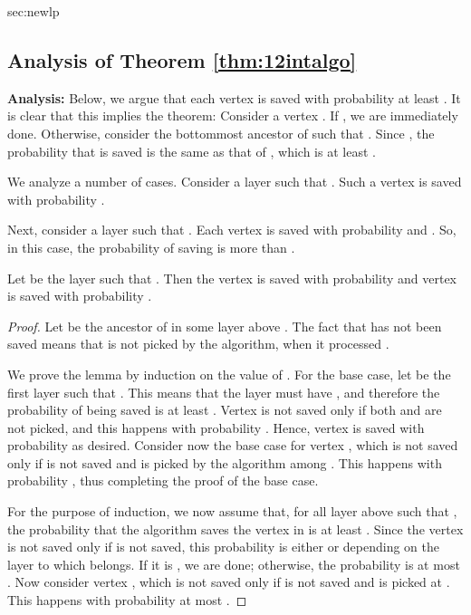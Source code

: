 \begin{appendixextra}{sec:newlp}{\subsection{Analysis of Theorem \ref{thm:12intalgo}}}
\textbf{Analysis: }    
Below, we argue that each vertex  is saved with probability at least . 
It is clear that this implies the theorem: Consider a vertex .
If , we are immediately done. Otherwise, consider the bottommost ancestor  of  such that . 
Since , the probability that  is saved is the same as that of , which is at least .    

We analyze a number of cases.
Consider a layer  such that . 
Such a vertex  is saved with probability . 

Next, consider a layer  such that . 
Each vertex  is saved with probability  and . 
So, in this case, the probability of saving  is more than .  

\begin{lemma}
\label{one-and-one} 
Let  be the layer such that . 
Then the vertex  is saved with probability  and vertex  is saved with probability . 
\end{lemma} 

\begin{proof} 
Let  be the ancestor of  in some layer above . 
The fact that  has not been saved means that  is not picked by the algorithm, when it processed . 

We prove the lemma by induction on the value of . 
For the base case, let  be the first layer such that .
This means that the layer  must have , and therefore the probability of  being saved is at least . 
Vertex  is not saved only if both  and  are not picked, and this happens with probability .
Hence, vertex  is saved with probability  as desired.   
Consider now the base case for vertex , which is not saved only if  is not saved and  is picked by the algorithm among .
This happens with probability , thus completing the proof of the base case.   


 For the purpose of induction, we now assume that, for all layer  above  such that , the probability that the algorithm saves the vertex in  is at least .
Since the vertex  is not saved only if  is not saved, this probability is either  or  depending on the layer to which  belongs. If it is , we are done; otherwise, the probability is at most .   
Now consider vertex , which is not saved only if  is not saved and  is picked at . This happens with probability at most .  
\end{proof} 



\end{appendixextra}
